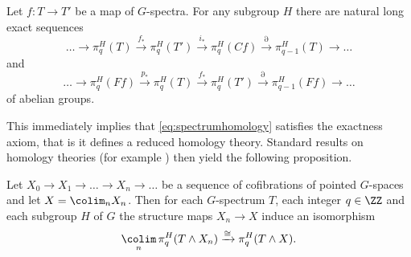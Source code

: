 \begin{thm}\label{thm:(co)fibersequences}
Let $f:T\to T'$ be a map of $G$-spectra. For any subgroup $H$
there are natural long exact sequences
\[
\ldots\to\pi_q^H(T)\xrightarrow{f_\ast} \pi_q^H(T')
\xrightarrow{i_\ast} \pi_q^H(Cf)\xrightarrow{\partial}
\pi_{q-1}^H(T)\to \ldots
\]
and
\[
\ldots \to \pi_q^H(Ff)\xrightarrow{p_\ast} \pi_q^H(T)\xrightarrow{f_\ast} \pi_q^H(T')
\xrightarrow{\partial} \pi_{q-1}^H(Ff)\to \ldots
\]
of abelian groups.
\end{thm}
This immediately implies that \eqref{eq:spectrumhomology} satisfies the exactness axiom,
that is it defines a reduced homology theory. Standard results on homology theories
(for example \cite[Theorem~10.8.1 and Proposition~10.8.4, \pno~271-272]{diecktop})
then yield the following proposition.

\begin{prop}\label{prop:colimitshomotopygroups}
Let $X_0\to X_1\to\ldots \to X_n\to \ldots$ be a sequence of cofibrations of pointed $G$-spaces
and let $X = \colim_n X_n$. Then for each $G$-spectrum $T$, each integer $q\in \ZZ$
and each subgroup $H$ of $G$ the structure maps $X_n\to X$ induce an isomorphism
\begin{equation}
\underset{n}{\colim} \,\pi_q^H(T\wedge X_n)\xrightarrow{\cong} \pi_q^H(T\wedge X).
\end{equation}

\end{prop}


